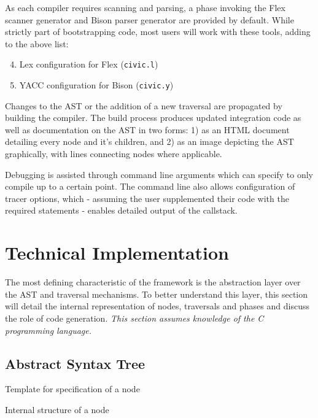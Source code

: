 \documentclass[twoside,openright]{uva-bachelor-thesis}
\newcommand{\code}[1]{\texttt{\footnotesize#1}}
\begin{document}
		As each compiler requires scanning and parsing, a phase invoking the Flex scanner generator and Bison parser generator are provided by default. While strictly part of bootstrapping code, most users will work with these tools, adding to the above list:
		\begin{enumerate}
			\setcounter{enumi}{3}
			\item Lex configuration for Flex (\code{civic.l})
			\item YACC configuration for Bison (\code{civic.y})
		\end{enumerate}
		
		Changes to the AST or the addition of a new traversal are propagated by building the compiler. The build process produces updated integration code as well as documentation on the AST in two forms: 1) as an HTML document detailing every node and it's children, and 2) as an image depicting the AST graphically, with lines connecting nodes where applicable.
		
		Debugging is assisted through command line arguments which can specify to only compile up to a certain point. The command line also allows configuration of tracer options, which - assuming the user supplemented their code with the required statements - enables detailed output of the callstack.
	
		
	\section{Technical Implementation}
	\label{c-impl}
		The most defining characteristic of the framework is the abstraction layer over the AST and traversal mechanisms. To better understand this layer, this section will detail the internal representation of nodes, traversals and phases and discuss the role of code generation. \emph{This section assumes knowledge of the C programming language.}
				
		\subsection{Abstract Syntax Tree}
		\label{c-ast}
			\begin{codebox}[label=xml-node-structure]{Template for specification of a node}
			\end{codebox}
			
			\begin{codebox}[label=c-node-structure]{Internal structure of a node}
			\end{codebox}
			
\end{document}
